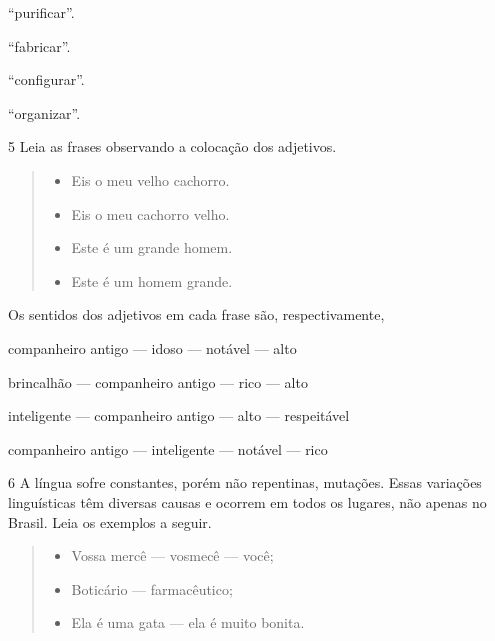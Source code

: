 \begin{escolha}
\item ``purificar''.

\item ``fabricar''.

\item ``configurar''.

\item ``organizar''.
\end{escolha}

\num{5} Leia as frases observando a colocação dos adjetivos.

\begin{quote}
\begin{itemize}
\item Eis o meu velho cachorro.

\item Eis o meu cachorro velho.

\item Este é um grande homem.

\item Este é um homem grande.
\end{itemize}
\end{quote}

Os sentidos dos adjetivos em cada frase são, respectivamente,

\begin{escolha}
\item companheiro antigo --- idoso --- notável --- alto

\item brincalhão --- companheiro antigo --- rico --- alto

\item inteligente --- companheiro antigo --- alto --- respeitável

\item companheiro antigo --- inteligente --- notável --- rico
\end{escolha}



\num{6} A língua sofre constantes, porém não repentinas, mutações. Essas
variações linguísticas têm diversas causas e ocorrem em todos os
lugares, não apenas no Brasil. Leia os exemplos a seguir.

\begin{quote}
\begin{itemize}
\item Vossa mercê --- vosmecê --- você;

\item Boticário --- farmacêutico;

\item Ela é uma gata --- ela é muito bonita.
\end{itemize}
\end{quote}

